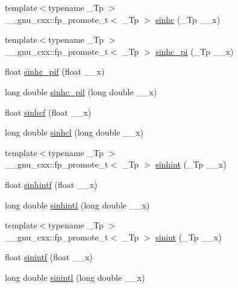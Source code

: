 \begin{DoxyCompactItemize}
\item 
{\footnotesize template$<$typename \+\_\+\+Tp $>$ }\\\+\_\+\+\_\+gnu\+\_\+cxx\+::fp\+\_\+promote\+\_\+t$<$ \+\_\+\+Tp $>$ \hyperlink{group__gnu__math__spec__func_gaf2f02e4143e7beb97352cef4b7fcb663}{sinhc} (\+\_\+\+Tp \+\_\+\+\_\+x)
\item 
{\footnotesize template$<$typename \+\_\+\+Tp $>$ }\\\+\_\+\+\_\+gnu\+\_\+cxx\+::fp\+\_\+promote\+\_\+t$<$ \+\_\+\+Tp $>$ \hyperlink{group__gnu__math__spec__func_ga8bb6034e28d48879845bf64818cc06e1}{sinhc\+\_\+pi} (\+\_\+\+Tp \+\_\+\+\_\+x)
\item 
float \hyperlink{group__gnu__math__spec__func_ga26e54504db6541550266140f5264acbe}{sinhc\+\_\+pif} (float \+\_\+\+\_\+x)
\item 
long double \hyperlink{group__gnu__math__spec__func_gaa572bf7633f457c86cef65bfd6ec4ad9}{sinhc\+\_\+pil} (long double \+\_\+\+\_\+x)
\item 
float \hyperlink{group__gnu__math__spec__func_gadaa7ea78625cc2eeb70213a50719813d}{sinhcf} (float \+\_\+\+\_\+x)
\item 
long double \hyperlink{group__gnu__math__spec__func_ga7467a001bb18ef8bff0a7e9927bab356}{sinhcl} (long double \+\_\+\+\_\+x)
\item 
{\footnotesize template$<$typename \+\_\+\+Tp $>$ }\\\+\_\+\+\_\+gnu\+\_\+cxx\+::fp\+\_\+promote\+\_\+t$<$ \+\_\+\+Tp $>$ \hyperlink{group__gnu__math__spec__func_gab5cbc831c5fab99a967c03d059f1ad59}{sinhint} (\+\_\+\+Tp \+\_\+\+\_\+x)
\item 
float \hyperlink{group__gnu__math__spec__func_ga375ca3ceb1eafd678e298d0aea4bb3e6}{sinhintf} (float \+\_\+\+\_\+x)
\item 
long double \hyperlink{group__gnu__math__spec__func_ga8b7f1a070be7233a3179e3cbded387ee}{sinhintl} (long double \+\_\+\+\_\+x)
\item 
{\footnotesize template$<$typename \+\_\+\+Tp $>$ }\\\+\_\+\+\_\+gnu\+\_\+cxx\+::fp\+\_\+promote\+\_\+t$<$ \+\_\+\+Tp $>$ \hyperlink{group__gnu__math__spec__func_ga076c8d52588904f5711c41781f8acfa0}{sinint} (\+\_\+\+Tp \+\_\+\+\_\+x)
\item 
float \hyperlink{group__gnu__math__spec__func_ga8b63406fec50d7e00470521b82fb32a2}{sinintf} (float \+\_\+\+\_\+x)
\item 
long double \hyperlink{group__gnu__math__spec__func_ga3ff83e5c5f1435064b6942ca8b7c8779}{sinintl} (long double \+\_\+\+\_\+x)

\end{DoxyCompactItemize}
